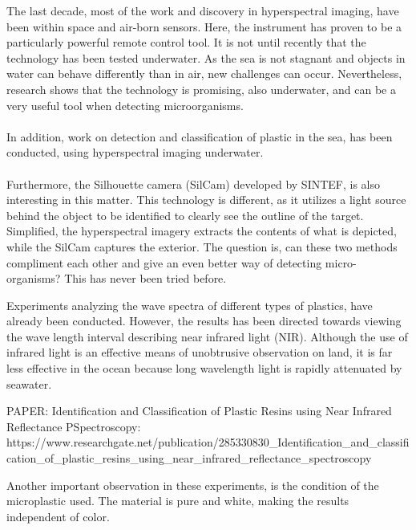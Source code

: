 The last decade, most of the work and discovery in hyperspectral imaging, have been within space and air-born sensors. Here, the instrument has proven to be a particularly powerful remote control tool. It is not until recently that the technology has been tested underwater. As the sea is not stagnant and objects in water can behave differently than in air, new challenges can occur. Nevertheless, research shows that the technology is promising, also underwater, and can be a very useful tool when detecting microorganisms.
\\\\
In addition, work on detection and classification of plastic in the sea, has been conducted, using hyperspectral imaging underwater. 
\\\\
Furthermore, the Silhouette camera (SilCam) developed by SINTEF, is also interesting in this matter. This technology is different, as it utilizes a light source behind the object to be identified to clearly see the outline of the target. Simplified, the hyperspectral imagery extracts the contents of what is depicted, while the SilCam captures the exterior. The question is, can these two methods compliment each other and give an even better way of detecting micro-organisms? This has never been tried before.

Experiments analyzing the wave spectra of different types of plastics, have already been conducted. However, the results has been directed towards viewing the wave length interval describing near infrared light (NIR). Although the use of infrared light is an effective means of unobtrusive observation on land, it is far less effective in the ocean because long wavelength light is rapidly attenuated by seawater.

PAPER: Identification and Classification of Plastic Resins using Near Infrared Reflectance PSpectroscopy: https://www.researchgate.net/publication/285330830_Identification_and_classification_of_plastic_resins_using_near_infrared_reflectance_spectroscopy

Another important observation in these experiments, is the condition of the microplastic used. The material is pure and white, making the results independent of color. 

